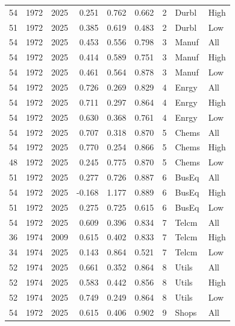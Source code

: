 \documentclass[10pt]{article}
\begin{document}
\begin{landscape}
\begin{longtable}{rrrrrrrll}
54 & 1972 & 2025 & 0.251 & 0.762 & 0.662 & 2 & Durbl & High \\
51 & 1972 & 2025 & 0.385 & 0.619 & 0.483 & 2 & Durbl & Low \\
54 & 1972 & 2025 & 0.453 & 0.556 & 0.798 & 3 & Manuf & All \\
54 & 1972 & 2025 & 0.414 & 0.589 & 0.751 & 3 & Manuf & High \\
54 & 1972 & 2025 & 0.461 & 0.564 & 0.878 & 3 & Manuf & Low \\
54 & 1972 & 2025 & 0.726 & 0.269 & 0.829 & 4 & Enrgy & All \\
54 & 1972 & 2025 & 0.711 & 0.297 & 0.864 & 4 & Enrgy & High \\
54 & 1972 & 2025 & 0.630 & 0.368 & 0.761 & 4 & Enrgy & Low \\
54 & 1972 & 2025 & 0.707 & 0.318 & 0.870 & 5 & Chems & All \\
54 & 1972 & 2025 & 0.770 & 0.254 & 0.866 & 5 & Chems & High \\
48 & 1972 & 2025 & 0.245 & 0.775 & 0.870 & 5 & Chems & Low \\
51 & 1972 & 2025 & 0.277 & 0.726 & 0.887 & 6 & BusEq & All \\
54 & 1972 & 2025 & -0.168 & 1.177 & 0.889 & 6 & BusEq & High \\
51 & 1972 & 2025 & 0.275 & 0.725 & 0.615 & 6 & BusEq & Low \\
54 & 1972 & 2025 & 0.609 & 0.396 & 0.834 & 7 & Telcm & All \\
36 & 1974 & 2009 & 0.615 & 0.402 & 0.833 & 7 & Telcm & High \\
34 & 1974 & 2025 & 0.143 & 0.864 & 0.521 & 7 & Telcm & Low \\
52 & 1974 & 2025 & 0.661 & 0.352 & 0.864 & 8 & Utils & All \\
52 & 1974 & 2025 & 0.583 & 0.442 & 0.856 & 8 & Utils & High \\
52 & 1974 & 2025 & 0.749 & 0.249 & 0.864 & 8 & Utils & Low \\
54 & 1972 & 2025 & 0.615 & 0.406 & 0.902 & 9 & Shops & All \\
\end{longtable}


\end{landscape}
\end{document}
